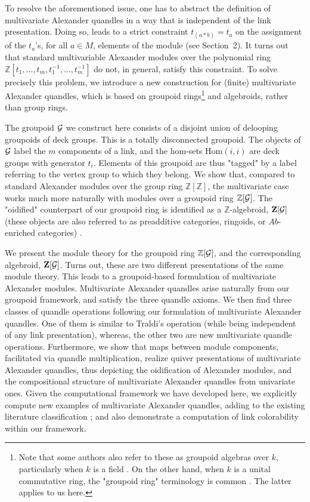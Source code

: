 \documentclass[a4paper,12pt]{article}
\newcommand{\Z}{\mathbb{Z}}
\newcommand{\Zb}{\mathbf{Z}}
\newcommand{\Hom}{\mathrm{Hom}}
\begin{document}
To resolve the aforementioned issue, one has to abstract the definition of  multivariate Alexander quandles in a way that is independent of the link presentation. Doing so, leads to a strict constraint  $t_{(a * b)} = t_a$ on the 
 assignment of the $t_a$'s, for all $a \in M$, elements of the module (see Section~2). It turns out that standard multivariable Alexander modules over the polynomial ring $\Z[t_1, ..., t_m, t_1^{-1}, ..., t_m^{-1}]$ do not, in general, satisfy this constraint. To solve precisely this problem, we introduce a new construction for (finite) multivariate Alexander quandles, which is based on groupoid rings\footnote{Note that some authors also refer to these as groupoid algebras over $k$, particularly when $k$ is a field \cite{khalkhali2013basic}. On the other hand, when $k$ is a unital commutative ring, the "groupoid ring" terminology is common \cite{lundstrom2006separable}. The latter applies to us here.}  and algebroids, rather than group rings.   

 
The groupoid ${\cal G}$ we construct here consists of a disjoint union of delooping groupoids of deck groups. This is a totally disconnected groupoid. The objects of ${\cal G}$ label the $m$ components of a link, and the hom-sets $\Hom(i,i)$ are deck groups with generator $t_i$. Elements of this groupoid are thus "tagged" by a label referring to the vertex group to which they belong. We show that, compared to standard Alexander modules over the group ring $\Z[\Z]$, the multivariate case works much more naturally with modules over a groupoid ring $\Z[{\cal G}]$.  The "oidified" counterpart of  our groupoid ring is identified as a $\Z$-algebroid, $\Zb[{\cal G}]$  (these objects are also referred to as  preadditive categories, ringoids, or $Ab$-enriched categories)   \cite{Mitchell1972, Kelly1982, mitchell1985, avi2026, nlab:ab-enriched_category}.  

We present the module theory for the groupoid ring $\Z[{\cal G}]$, and the corresponding algebroid, $\Zb[{\cal G}]$. Turns out, these are two different presentations of the same module theory. This leads to a groupoid-based formulation of multivariate Alexander modules.  Multivariate Alexander quandles arise naturally from our groupoid framework, and satisfy the three   quandle axioms. We then find three classes of quandle operations following our formulation of multivariate Alexander quandles. One of them is similar to Traldi's operation \cite{traldi1}  (while being independent of any link presentation), whereas, the other two are new multivariate quandle operations. Furthermore, we show that maps between module components, facilitated via quandle multiplication, realize quiver presentations of multivariate Alexander quandles, thus depicting the oidification of Alexander modules, and the compositional structure of multivariate Alexander quandles from univariate ones. Given the computational framework we have developed here, we   explicitly compute new examples of multivariate Alexander quandles, adding to the existing literature classification  \cite{nelson1, nelson2, lopes2006finite, vendramin2012, clark2014quandle, higashitani2024classification}; and also demonstrate a computation of link colorability within our framework. 
\end{document}
